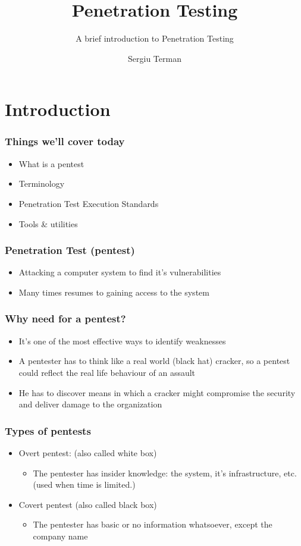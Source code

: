 \documentclass{beamer}
\title[Penetration Testing] %
{Penetration Testing}
\subtitle{A brief introduction to Penetration Testing}
\author[Sergiu Terman] %
{Sergiu Terman}
\institute[FIT CVUT] %
{CVUT}
\newcommand\ListFont{\fontsize{15}{30}\selectfont}
\begin{document}
\frame{\titlepage}

\section{Introduction}

\begin{frame}
	\frametitle{Things we'll cover today}
	\ListFont
	\begin{itemize}
		\item<2-> What is a pentest
		\item<3-> Terminology
		\item<4->Penetration Test Execution Standards
		\item<5> Tools \& utilities
	\end{itemize}
\end{frame}

\begin{frame}
	\frametitle{Penetration Test (pentest)}
	\fontsize{15}{50}\selectfont
	\begin{itemize}
	\item Attacking a computer system to find it’s vulnerabilities
	\item Many times resumes to gaining access to the system
	\end{itemize}
\end{frame}

\begin{frame}
	\frametitle{Why need for a pentest?}
	\fontsize{12}{15}\selectfont
	\begin{itemize} \itemsep4ex
	\item<2-> It’s one of the most effective ways to identify weaknesses
	\item<3-> A pentester has to think like a real world (black hat) cracker, so a pentest could reflect the \alert<4->{real life behaviour of an assault}
	\item<5> He has to discover means in which a cracker might compromise the security and deliver damage to the organization
	\end{itemize}
\end{frame}

\begin{frame}
	\frametitle{Types of pentests}
	\begin{itemize} \itemsep8ex
	\item<2-> Overt pentest: (also called white box)
		\begin{itemize}
		\item<3-> The pentester has insider knowledge: the system, it’s infrastructure, etc. (used when time is limited.)
		\end{itemize}

	\item<4-> Covert pentest (also called black box)
		\begin{itemize}
		\item<5-> The pentester has basic or no information whatsoever, except the company name
		\end{itemize}
	\end{itemize}
\end{frame}
\end{document}
